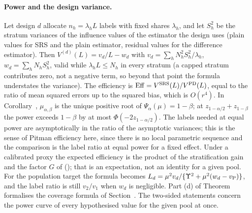 \paragraph{Power and the design variance.} Let design $d$ allocate $n_h=\lambda_hL$ labels with fixed shares $\lambda_h$, and let $S^2_h$ be the stratum variances of the influence values of the estimator the design uses (plain values for SRS and the plain estimator, residual values for the difference estimator). Then $V^{(d)}(L)=v_d/L-w_d$ with $v_d=\sum_hN_h^2S^2_h/\lambda_h$, $w_d=\sum_hN_hS^2_h$, valid while $\lambda_hL\le N_h$ in every stratum (a capped stratum contributes zero, not a negative term, so beyond that point the formula understates the variance). The efficiency is $\mathrm{Eff}=V^{\rm SRS}(L)/V^{\rm PD}(L)$, equal to the ratio of mean squared errors up to the squared bias, which is $O(r^4)$. In Corollary~, $\mu_{\alpha,\beta}$ is the unique positive root of $\Psi_\alpha(\mu)=1-\beta$; at $z_{1-\alpha/2}+z_{1-\beta}$ the power exceeds $1-\beta$ by at most $\Phi(-2z_{1-\alpha/2})$. The labels needed at equal power are asymptotically in the ratio of the asymptotic variances; this is the sense of Pitman efficiency here, since there is no local parametric sequence and the comparison is the label ratio at equal power for a fixed effect. Under a calibrated proxy the expected efficiency is the product of the stratification gain and the factor $G$ of (); that is an expectation, not an identity for a given pool. For the population target the formula becomes $L_d=\mu^2v_d/\{\Upsilon^2+\mu^2(w_d-v_{\rm P})\}$, and the label ratio is still $v_2/v_1$ when $w_d$ is negligible. Part (d) of Theorem~ formalises the coverage formula of Section~. The two-sided statements concern the power curve of every hypothesised value for the given pool at once.

